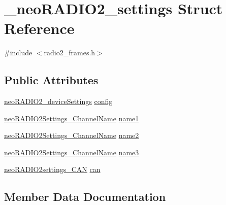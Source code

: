 \hypertarget{struct__neo_r_a_d_i_o2__settings}{}\section{\+\_\+neo\+R\+A\+D\+I\+O2\+\_\+settings Struct Reference}
\label{struct__neo_r_a_d_i_o2__settings}


{\ttfamily \#include $<$radio2\+\_\+frames.\+h$>$}

\subsection*{Public Attributes}
\begin{DoxyCompactItemize}
\item 
\mbox{\hyperlink{radio2__frames_8h_a405744b99692efe3db4f145fda4fc9aa}{neo\+R\+A\+D\+I\+O2\+\_\+device\+Settings}} \mbox{\hyperlink{struct__neo_r_a_d_i_o2__settings_a61401df235d69cd375f0adf514c37eed}{config}}
\item 
\mbox{\hyperlink{radio2__frames_8h_a1408425073c1e67e3acadd20d943aa60}{neo\+R\+A\+D\+I\+O2\+Settings\+\_\+\+Channel\+Name}} \mbox{\hyperlink{struct__neo_r_a_d_i_o2__settings_adaa454184513648475c448a8091c5a64}{name1}}
\item 
\mbox{\hyperlink{radio2__frames_8h_a1408425073c1e67e3acadd20d943aa60}{neo\+R\+A\+D\+I\+O2\+Settings\+\_\+\+Channel\+Name}} \mbox{\hyperlink{struct__neo_r_a_d_i_o2__settings_a71e052f84c52930fec20667099a940c1}{name2}}
\item 
\mbox{\hyperlink{radio2__frames_8h_a1408425073c1e67e3acadd20d943aa60}{neo\+R\+A\+D\+I\+O2\+Settings\+\_\+\+Channel\+Name}} \mbox{\hyperlink{struct__neo_r_a_d_i_o2__settings_a575809bc427a39067f3ba1f2c9d1c180}{name3}}
\item 
\mbox{\hyperlink{radio2__frames_8h_ad1b72cc6c9fb1df42f29f607adbbb037}{neo\+R\+A\+D\+I\+O2settings\+\_\+\+C\+AN}} \mbox{\hyperlink{struct__neo_r_a_d_i_o2__settings_ab092b3245911380b8041254be9739982}{can}}
\end{DoxyCompactItemize}


\subsection{Member Data Documentation}
\mbox{\label{struct__neo_r_a_d_i_o2__settings_ab092b3245911380b8041254be9739982}} 

